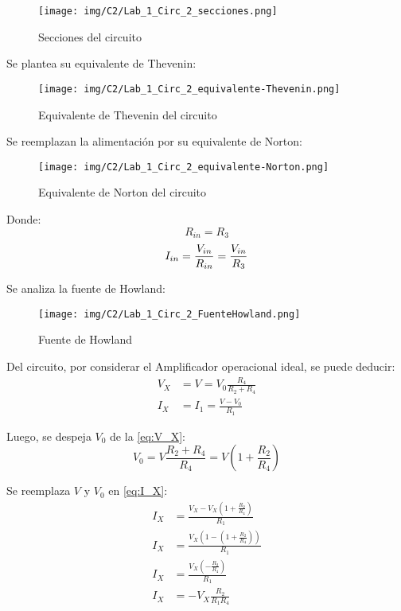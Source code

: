\begin{figure}[H]
    \centering
    \texttt{[image: img/C2/Lab\_1\_Circ\_2\_secciones.png]}
    \caption{Secciones del circuito}
    \label{fig:Lab_1_Circ_2_secciones}
\end{figure}

Se plantea su equivalente de Thevenin:
\begin{figure}[H]
    \centering
    \texttt{[image: img/C2/Lab\_1\_Circ\_2\_equivalente-Thevenin.png]}
    \caption{Equivalente de Thevenin del circuito}
    \label{fig:Lab_1_Circ_2_Thevenin}
\end{figure}

Se reemplazan la alimentación por su equivalente de Norton:
\begin{figure}[H]
    \centering
    \texttt{[image: img/C2/Lab\_1\_Circ\_2\_equivalente-Norton.png]}
    \caption{Equivalente de Norton del circuito}
    \label{fig:Lab_1_Circ_2_Norton}
\end{figure}

Donde:
\begin{equation}
    R_{in}=R_3
\end{equation}
\begin{equation}
    I_{in}=\frac{V_{in}}{R_{in}}=\frac{V_{in}}{R_3}
    \label{eq:I_{in}}
\end{equation}

Se analiza la fuente de Howland:
\begin{figure}[H]
    \centering
    \texttt{[image: img/C2/Lab\_1\_Circ\_2\_FuenteHowland.png]}
    \caption{Fuente de Howland}
    \label{fig:Lab_1_Circ_2_FuenteHowland}
\end{figure}

Del circuito, por considerar el Amplificador operacional ideal, se puede deducir:
\begin{align}
    V_X &= V=V_0\frac{R_4}{R_2+R_4} \label{eq:V_X} \\
    I_X &= I_1=\frac{V-V_0}{R_1} \label{eq:I_X}
\end{align}

Luego, se despeja $V_0$ de la \autoref{eq:V_X}:
\begin{equation*}
    V_0=V\frac{R_2+R_4}{R_4}=V\left(1+\frac{R_2}{R_4}\right)
\end{equation*}

Se reemplaza $V$ y $V_0$ en \autoref{eq:I_X}:
\begin{align*}
    I_X &= \frac{V_X - V_X\left(1 + \frac{R_2}{R_4}\right)}{R_1} \\
    I_X &= \frac{V_X\left(1 - \left(1 + \frac{R_2}{R_4}\right)\right)}{R_1} \\
    I_X &= \frac{V_X\left(- \frac{R_2}{R_4}\right)}{R_1} \\
    I_X &= -V_X \frac{R_2}{R_1 R_4}
\end{align*}

